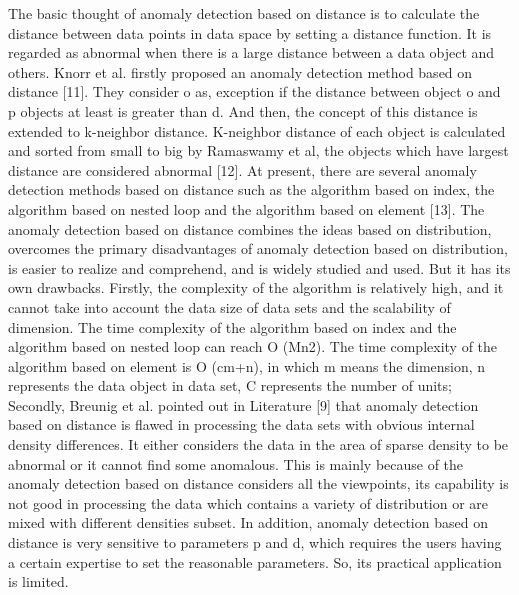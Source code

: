 The basic thought of anomaly detection based on
distance is to calculate the distance between data points in
data space by setting a distance function.
It is regarded as
abnormal when there is a large distance between a data
object and others.
Knorr et al.
firstly proposed an anomaly
detection method based on distance [11].
They consider o
as,
exception if the distance between object o and
p objects at least is greater than d.
And then,
the concept of
this distance is extended to k-neighbor distance.
K-neighbor
distance of each object is calculated and
sorted from small to big by Ramaswamy et al,
the objects which have largest
distance are considered abnormal [12].
At present,
there are several anomaly detection methods based on distance such as
the algorithm based on index,
the algorithm based on
nested loop and the algorithm based on element [13].
The anomaly detection based on distance combines the ideas
based on distribution,
overcomes the primary disadvantages
of anomaly detection based on distribution,
is easier to
realize and comprehend,
and is widely studied and used.
But it has its own drawbacks.
Firstly,
the complexity of the
algorithm is relatively high,
and it cannot take into account
the data size of data sets and the scalability of dimension.
The time complexity of the algorithm based on index and
the algorithm based on nested loop can reach O (Mn2).
The
time complexity of the algorithm based on element is O
(cm+n),
in which m means the dimension,
n represents the
data object in data set,
C represents the number of units;
Secondly,
Breunig et al.
pointed out in Literature [9] that
anomaly detection based on distance is flawed in
processing the data sets with obvious internal density
differences.
It either considers the data in the area of sparse
density to be abnormal or it cannot find some anomalous.
This is mainly because of the anomaly detection based on
distance considers all the viewpoints,
its capability is not
good in processing the data which contains a variety of
distribution or are mixed with different densities subset.
In addition,
anomaly detection based on distance is very
sensitive to parameters p and d,
which requires the users
having a certain expertise to set the reasonable parameters.
So,
its practical application is limited.


